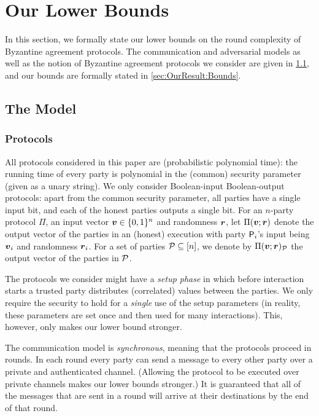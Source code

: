 \section{Our Lower Bounds}\label{sec:OurResult}

In this section, we formally state our lower bounds on the round complexity of Byzantine agreement protocols. The communication and adversarial models as well as the notion of Byzantine agreement protocols we consider are given in \cref{sec:OurResults:Model}, and our bounds are formally stated in \cref{sec:OurResult:Bounds}.

\subsection{The Model}\label{sec:OurResults:Model}

\subsubsection{Protocols}
All protocols considered in this paper are \ppt (probabilistic polynomial time): the running time of every party is polynomial in the (common) security parameter (given as a unary string). We only consider Boolean-input Boolean-output protocols: apart from the common security parameter, all parties have a single input bit, and each of the honest parties outputs a single bit. For an $n$-party protocol $\Pi$, an input vector ${ \boldsymbol{v}}\in {\{0,1\}^n}$ and randomness ${ \boldsymbol{r}}$, let $\Pi({ \boldsymbol{v}}; { \boldsymbol{r}})$ denote the output vector of the parties in an (honest) execution with party $\mathsf{P}_i$'s input being ${ \boldsymbol{v}}_i$ and randomness ${ \boldsymbol{r}}_i$.
For a set of parties $\mathcal{P} \subseteq [n]$, we denote by $\Pi({ \boldsymbol{v}}; { \boldsymbol{r}})_{\mathcal{P}}$ the output vector of the parties in $\mathcal{P}$.

The protocols we consider might have a \emph{setup phase} in which before interaction starts a trusted party distributes (correlated) values between the parties. We only require the security to hold for a \emph{single} use of the setup parameters (in reality, these parameters are set once and then used for many interactions). This, however, only makes our lower bound stronger.

The communication model is \emph{synchronous}, meaning that the protocols proceed in rounds. In each round every party can send a message to every other party over a private and authenticated channel. (Allowing the protocol to be executed over private channels makes our lower bounds stronger.) It is guaranteed that all of the messages that are sent in a round will arrive at their destinations by the end of that round.

